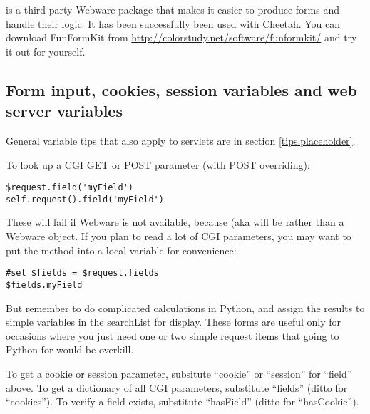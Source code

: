  is a third-party Webware package that makes it easier to
produce forms and handle their logic.  It has been successfully been used with
Cheetah.  You can download FunFormKit from
\url{http://colorstudy.net/software/funformkit/} and try it out for yourself.


\subsection{Form input, cookies, session variables and web server variables}
\label{webware.input}

General variable tips that also apply to servlets are in section
\ref{tips.placeholder}.

To look up a CGI GET or POST parameter (with POST overriding):
\begin{verbatim}
$request.field('myField')     
self.request().field('myField')
\end{verbatim}
These will fail if Webware is not available, because 
(aka  will be  rather than a Webware
 object.  If you plan to read a lot of CGI parameters,
you may want to put the  method into a local variable for
convenience:
\begin{verbatim}
#set $fields = $request.fields
$fields.myField
\end{verbatim}
But remember to do complicated calculations in Python, and assign the results
to simple variables in the searchList for display.  These 
forms are useful only for occasions where you just need one or two simple
request items that going to Python for would be overkill.

To get a cookie or session parameter, subsitute ``cookie'' or ``session'' for
``field'' above.  To get a dictionary of all CGI parameters, substitute
``fields'' (ditto for ``cookies'').  To verify a field exists,
substitute ``hasField'' (ditto for ``hasCookie'').  

